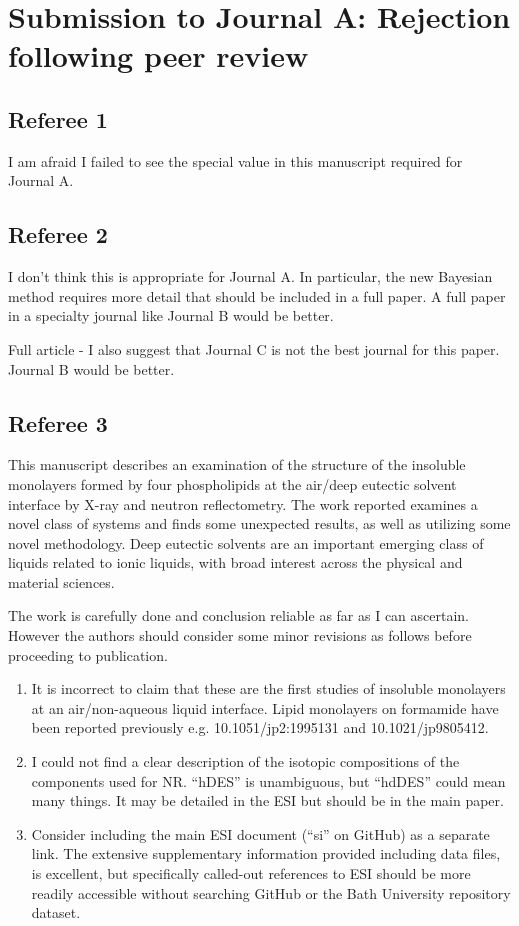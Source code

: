 \documentclass[amsmath,amssymb,twocolumn,superscriptaddress]{revtex4-1}
\begin{document}
\section{Submission to Journal A: Rejection following peer review}

\subsection{Referee 1}
I am afraid I failed to see the special value in this manuscript
required for Journal A.

\subsection{Referee 2}
I don't think this is appropriate for Journal A.
In particular, the new Bayesian method requires more detail that should be included in a full paper.
A full paper in a specialty journal like Journal B would be better.

Full article - I also suggest that Journal C is not the best journal for this paper.
Journal B would be better.

\subsection{Referee 3}
This manuscript describes an examination of the structure of the insoluble monolayers formed by four phospholipids at the air/deep eutectic solvent interface by X-ray and neutron reflectometry.
The work reported examines a novel class of systems and finds some unexpected results, as well as utilizing some novel methodology.
Deep eutectic solvents are an important emerging class of liquids related to ionic liquids, with broad interest across the physical and material sciences.

The work is carefully done and conclusion reliable as far as I can ascertain.
However the authors should consider some minor revisions as follows before proceeding to publication.

\begin{enumerate}
\item It is incorrect to claim that these are the first studies of insoluble monolayers at an air/non-aqueous liquid interface. Lipid monolayers on formamide have been reported previously e.g. 10.1051/jp2:1995131 and 10.1021/jp9805412.

\item I could not find a clear description of the isotopic compositions of the components used for NR. ``hDES'' is unambiguous, but ``hdDES'' could mean many things. It may be detailed in the ESI but should be in the main paper.

\item Consider including the main ESI document (``si'' on GitHub) as a separate link. The extensive supplementary information provided including data files, is excellent, but specifically called-out references to ESI should be more readily accessible without searching GitHub or the Bath University repository dataset.
\end{enumerate}
\end{document}
